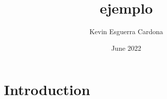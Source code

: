 \documentclass[12pt, letterpaper]{article}
\title{ejemplo}
\author{Kevin  Esguerra Cardona}
\date{June 2022}
\begin{document}
\maketitle

\section{Introduction}
\end{document}
